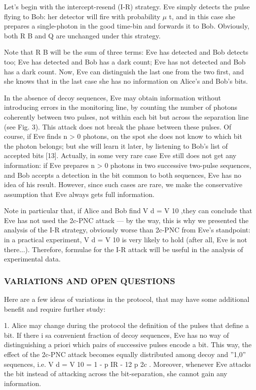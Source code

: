Let’s begin with the intercept-resend (I-R) strategy. Eve simply detects the pulse flying to Bob: her detector will fire with probability $\mu$ t, and in this case she prepares a single-photon in the good time-bin and forwards it to Bob. Obviously, both R B and Q are unchanged under this strategy.

Note that R B will be the sum of three terms: Eve has detected and Bob detects too; Eve has detected and Bob has a dark count; Eve has not detected and Bob has a dark count. Now, Eve can distinguish the last one from the two first, and she knows that in the last case she has no information on Alice’s and Bob’s bits.

In the absence of decoy sequences, Eve may obtain information without introducing errors in the monitoring line, by counting the number of photons coherently between two pulses, not within each bit but across the separation line (see Fig. 3). This attack does not break the phase between these pulses. Of course, if Eve finds n > 0 photons, on the spot she does not know to which bit the photon belongs; but she will learn it later, by listening to Bob’s list of accepted bits [13]. Actually, in some very rare case Eve still does not get any information: if Eve prepares n > 0 photons in two successive two-pulse sequences, and Bob accepts a detection in the bit common to both sequences, Eve has no idea of his result. However, since such cases are rare, we make the conservative assumption that Eve always gets full information.

Note in particular that, if Alice and Bob find V d = V 10 ,they can conclude that Eve has not used the 2c-PNC attack — by the way, this is why we presented the analysis of the I-R strategy, obviously worse than 2c-PNC from Eve’s standpoint: in a practical experiment, V d = V 10 is very likely to hold (after all, Eve is not there...). Therefore, formulae for the I-R attack will be useful in the analysis of experimental data.

\subsubsection{VARIATIONS AND OPEN QUESTIONS}

Here are a few ideas of variations in the protocol, that may have some additional benefit and require further study:

1. Alice may change during the protocol the definition of the pulses that define a bit. If there i sa convenient fraction of decoy sequences, Eve has no way of distinguishing a priori which pairs of successive pulses encode a bit. This way, the effect of the 2c-PNC attack becomes equally distributed among decoy and ”1,0” sequences, i.e. V d = V 10 = 1 - p IR - 12 p 2c . Moreover, whenever Eve attacks the bit instead of attacking across the bit-separation, she cannot gain any information.

